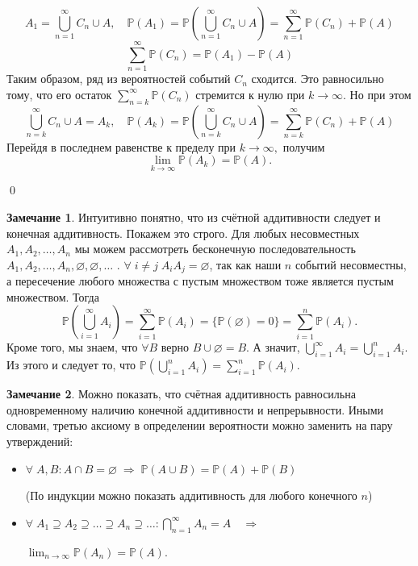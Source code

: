 \documentclass[oneside,final,14pt]{extreport}
\newcommand\myprob[1]{{\mathbb{P}(#1)}}
\renewenvironment{proof}{{\bfseries Доказательство.}}{\qed}
\theoremstyle{plain}
\theoremstyle{definition}
\newtheorem*{rmrk}{Замечание}
\theoremstyle{named}
\begin{document}
\begin{proof}
\begin{enumerate}
    $$A_1 = \bigcup\limits_{n = 1}^{\infty} C_n \cup A, \quad \myprob{A_1} = \mathbb{P}\left({\bigcup\limits_{n = 1}^{\infty} C_n \cup A}\right) = \sum\limits_{n=1}^{\infty} \myprob{C_n} + \myprob{A} $$
    $$ \sum\limits_{n=1}^{\infty} \myprob{C_n} = \myprob{A_1} - \myprob{A}$$
    Таким образом, ряд из вероятностей событий $C_n$ сходится. Это равносильно тому, что его остаток $\sum\limits_{n=k}^{\infty} \myprob{C_n}$ стремится к нулю при $k \rightarrow \infty$. Но при этом
    $$ \bigcup\limits_{n = k}^{\infty} C_n \cup A = A_k, \quad \myprob{A_k} = \mathbb{P}\left({\bigcup\limits_{n = k}^{\infty} C_n \cup A}\right) = \sum\limits_{n=k}^{\infty} \myprob{C_n} + \myprob{A} $$
    Перейдя в последнем равенстве к пределу при $k \rightarrow \infty,$ получим
    $$ \lim_{k \to \infty} \myprob{A_k} = \myprob{A}.$$

\end{enumerate}
\end{proof}

\begin{rmrk}
    Интуитивно понятно, что из счётной аддитивности следует и конечная аддитивность. Покажем это строго. Для любых несовместных $A_1, A_2, \ldots, A_n$ мы можем рассмотреть бесконечную последовательность $A_1, A_2, \ldots, A_n, \varnothing, \varnothing, \ldots$ . $\forall \; i \ne j \; A_i A_j = \varnothing$, так как наши $n$ событий несовместны, а пересечение любого множества с пустым множеством тоже является пустым множеством. Тогда 
    \begin{equation*}
        \mathbb{P}\left({\bigcup\limits_{i=1}^\infty A_i}\right) 
        = \sum\limits_{i=1}^\infty \myprob{A_i} 
        = \{\myprob{\varnothing} = 0\}
        = \sum\limits_{i=1}^n \myprob{A_i}.
    \end{equation*}
    Кроме того, мы знаем, что $\forall B$ верно $B \cup \varnothing = B$. А значит, $\bigcup\limits_{i = 1}^\infty A_i = \bigcup\limits_{i=1}^n A_i$.\\
    Из этого и следует то, что $\myprob{\bigcup\limits_{i=1}^n A_i} = \sum\limits_{i=1}^n \myprob{A_i}.$
\end{rmrk}

\begin{rmrk}
    Можно показать, что счётная аддитивность равносильна одновременному наличию конечной аддитивности и непрерывности. Иными словами, третью аксиому в определении вероятности можно заменить на пару утверждений:
    \begin{itemize}
        \item $\forall \; A, B \colon A \cap B = \varnothing \; \Rightarrow \; \myprob{A \cup B} = \myprob{A} + \myprob{B}$ 
        
        (По индукции можно показать аддитивность для любого конечного $n$)
        \item $ \forall \; A_1 \supseteq A_2 \supseteq \ldots \supseteq A_n \supseteq \ldots \colon \bigcap\limits_{n = 1}^{\infty} A_n
       = A \quad \Rightarrow$ 
       
       $\displaystyle \lim_{n \to \infty}\myprob{A_n} = \myprob{A}.$
    \end{itemize}
\end{rmrk}
\end{document}
